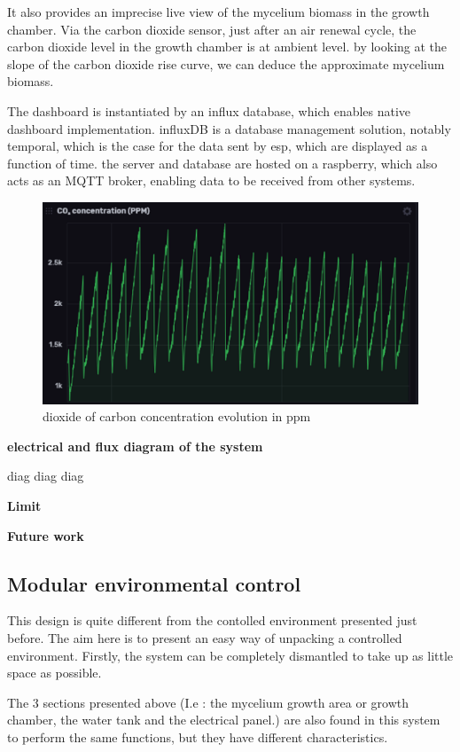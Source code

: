 It also provides an imprecise live view of the mycelium biomass in the growth chamber.
Via the carbon dioxide sensor, just after an air renewal cycle, the carbon dioxide level in the growth chamber is at ambient level. by looking at the slope of the carbon dioxide rise curve, we can deduce the approximate mycelium biomass. 

The dashboard is instantiated by an influx database, which enables native dashboard implementation. influxDB is a database management solution, notably temporal, which is the case for the data sent by esp, which are displayed as a function of time. 
the server and database are hosted on a raspberry, which also acts as an MQTT broker, enabling data to be received from other systems. 

\begin{figure}[h]
    \centering
    \includegraphics{images/CO2dashboard.png}
    \caption{dioxide of carbon concentration evolution in ppm}
    \label{fig:}
\end{figure} 


\textbf{electrical and flux diagram of the system }

diag diag diag

\textbf{Limit}


\textbf{Future work}

\subsection{Modular environmental control}

This design is quite different from the contolled environment presented just before. 
The aim here is to present an easy way of unpacking a controlled environment. Firstly, the system can be completely dismantled to take up as little space as possible. 

The 3 sections presented above (I.e : the mycelium growth area or growth chamber, the water tank and the electrical panel.) are also found in this system to perform the same functions, but they have different characteristics.

